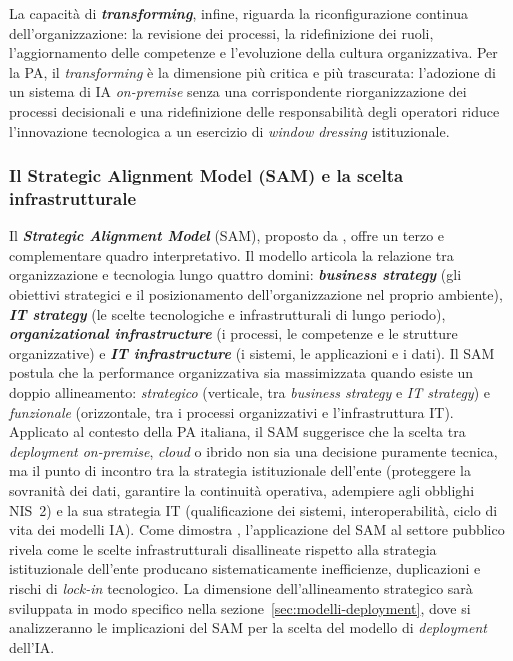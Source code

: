La capacità di \textbf{\textit{transforming}}, infine, riguarda la riconfigurazione continua dell'organizzazione: la revisione dei processi, la ridefinizione dei ruoli, l'aggiornamento delle competenze e l'evoluzione della cultura organizzativa. Per la PA, il \textit{transforming} è la dimensione più critica e più trascurata: l'adozione di un sistema di IA \textit{on-premise} senza una corrispondente riorganizzazione dei processi decisionali e una ridefinizione delle responsabilità degli operatori riduce l'innovazione tecnologica a un esercizio di \textit{window dressing} istituzionale.

\subsubsection*{Il Strategic Alignment Model (SAM) e la scelta infrastrutturale}

Il \textbf{\textit{Strategic Alignment Model}} (SAM), proposto da \textcite{HendersonVenkatraman1993}, offre un terzo e complementare quadro interpretativo. Il modello articola la relazione tra organizzazione e tecnologia lungo quattro domini: \textbf{\textit{business strategy}} (gli obiettivi strategici e il posizionamento dell'organizzazione nel proprio ambiente), \textbf{\textit{IT strategy}} (le scelte tecnologiche e infrastrutturali di lungo periodo), \textbf{\textit{organizational infrastructure}} (i processi, le competenze e le strutture organizzative) e \textbf{\textit{IT infrastructure}} (i sistemi, le applicazioni e i dati). Il SAM postula che la performance organizzativa sia massimizzata quando esiste un doppio allineamento: \textit{strategico} (verticale, tra \textit{business strategy} e \textit{IT strategy}) e \textit{funzionale} (orizzontale, tra i processi organizzativi e l'infrastruttura IT). Applicato al contesto della PA italiana, il SAM suggerisce che la scelta tra \textit{deployment on-premise}, \textit{cloud} o ibrido non sia una decisione puramente tecnica, ma il punto di incontro tra la strategia istituzionale dell'ente (proteggere la sovranità dei dati, garantire la continuità operativa, adempiere agli obblighi NIS~2) e la sua strategia IT (qualificazione dei sistemi, interoperabilità, ciclo di vita dei modelli IA). Come dimostra \textcite{CordeiroSAM2019}, l'applicazione del SAM al settore pubblico rivela come le scelte infrastrutturali disallineate rispetto alla strategia istituzionale dell'ente producano sistematicamente inefficienze, duplicazioni e rischi di \textit{lock-in} tecnologico. La dimensione dell'allineamento strategico sarà sviluppata in modo specifico nella sezione~\ref{sec:modelli-deployment}, dove si analizzeranno le implicazioni del SAM per la scelta del modello di \textit{deployment} dell'IA.


